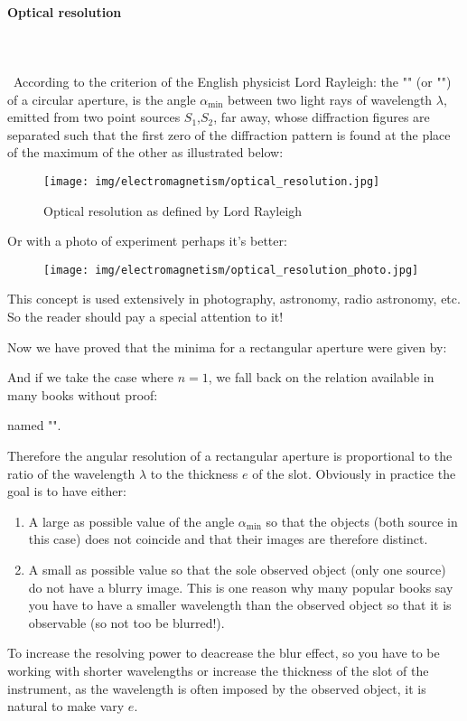 	\paragraph{Optical resolution}\mbox{}\\\\\
	According to the criterion of the English physicist Lord Rayleigh: the "" (or "") of a circular aperture, is the angle $\alpha_{\min}$ between two light rays of wavelength $\lambda$, emitted from two point sources $S_1$,$S_2$, far away, whose diffraction figures are separated such that the first zero of the diffraction pattern is found at the place of the maximum of the other as illustrated below:
	\begin{figure}[H]
		\centering
		\texttt{[image: img/electromagnetism/optical\_resolution.jpg]}
		\caption{Optical resolution as defined by Lord Rayleigh}
	\end{figure}
	Or with a photo of experiment perhaps it's better:
	\begin{figure}[H]
		\centering
		\texttt{[image: img/electromagnetism/optical\_resolution\_photo.jpg]}
	\end{figure}
	This concept is used extensively in photography, astronomy, radio astronomy, etc. So the reader should pay a special attention to it!
	
	Now we have proved that the minima for a rectangular aperture were given by:
	
	And if we take the case where $n=1$, we fall back on the relation available in many books without proof:
	
	named "".
	
	Therefore the angular resolution of a rectangular aperture is proportional to the ratio of the wavelength $\lambda$ to the thickness $e$ of the slot. Obviously in practice the goal is to have either:
	
	\begin{enumerate}
		\item A large as possible value of the angle $\alpha_{\min}$ so that the objects (both source in this case) does not coincide and that their images are therefore distinct.

		\item A small as possible value  so that the sole observed object (only one source) do not have a blurry image. This is one reason why many popular books say you have to have a smaller wavelength than the observed object so that it is observable (so not too be blurred!).
	\end{enumerate}
	To increase the resolving power to deacrease the blur effect, so you have to be working with shorter wavelengths or increase the thickness of the slot of the instrument, as the wavelength is often imposed by the observed object, it is natural to make vary $e$.
	
